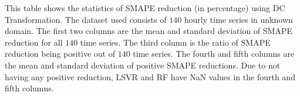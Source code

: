 \begin{center}
    \begin{table}
        \caption{Statistics of SMAPE reduction (\%) using DCT (hourly unknown domain)}
        {\raggedright \footnotesize This table shows the statistics of SMAPE reduction (in percentage) using DC Transformation. The dataset used consists of $140$ hourly time series in unknown domain. The first two columns are the mean and standard deviation of SMAPE reduction for all $140$ time series. The third column is the ratio of SMAPE reduction being positive out of $140$ time series. The fourth and fifth columns are the mean and standard deviation of positive SMAPE reductions. Due to not having any positive reduction, LSVR and RF have NaN values in the fourth and fifth columns. \par}
        \label{tbl: hourly smape reduction}
    \end{table}
\end{center}



